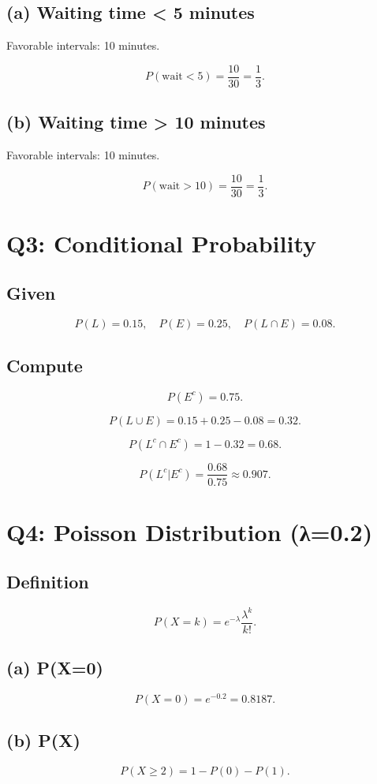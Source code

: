 \documentclass[12pt]{article}
\begin{document}
\subsection*{(a) Waiting time < 5 minutes}
Favorable intervals: 10 minutes.

\[
P(\text{wait} < 5) = \frac{10}{30} = \frac{1}{3}.
\]

\subsection*{(b) Waiting time > 10 minutes}
Favorable intervals: 10 minutes.

\[
P(\text{wait} > 10) = \frac{10}{30} = \frac{1}{3}.
\]

\section*{Q3: Conditional Probability}

\subsection*{Given}
\[
P(L)=0.15,\quad P(E)=0.25,\quad P(L\cap E)=0.08.
\]

\subsection*{Compute}
\[
P(E^c)=0.75.
\]

\[
P(L\cup E)=0.15+0.25-0.08=0.32.
\]

\[
P(L^c \cap E^c)=1-0.32=0.68.
\]

\[
P(L^c|E^c)=\frac{0.68}{0.75}\approx 0.907.
\]

\section*{Q4: Poisson Distribution (λ=0.2)}

\subsection*{Definition}
\[
P(X=k)=e^{-\lambda}\frac{\lambda^k}{k!}.
\]

\subsection*{(a) P(X=0)}
\[
P(X=0)=e^{-0.2}=0.8187.
\]

\subsection*{(b) P(X)}
\[
P(X\ge2)=1-P(0)-P(1).
\]
\end{document}
